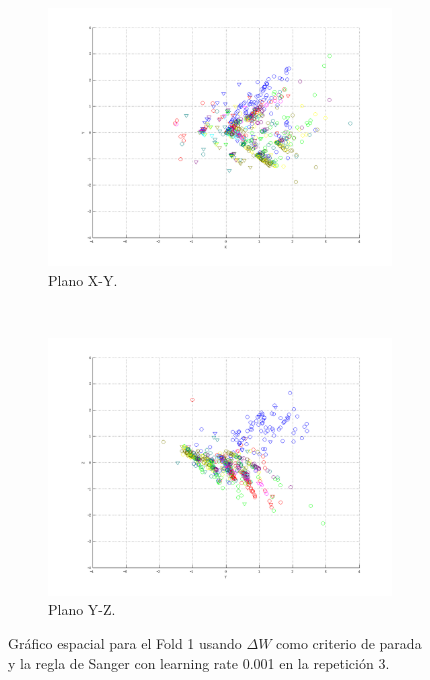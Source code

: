 \documentclass[informe.tex]{subfiles}
\begin{document}
\begin{figure}[H]
        \hspace*{-6.5cm}
        \begin{subfigure}[b]{0.49\textwidth}
                \includegraphics[width=\textwidth]{graficos/fold1_criterioParadap_reglas_alpha0_rep3_2XY.png}
                \caption{Plano X-Y.}
        \end{subfigure}
        ~
        \begin{subfigure}[b]{0.49\textwidth}
                \includegraphics[width=\textwidth]{graficos/fold1_criterioParadap_reglas_alpha0_rep3_3YZ.png}
                \caption{Plano Y-Z.}
        \end{subfigure}
	\restoregeometry
        \caption{Gráfico espacial para el Fold 1 usando $\Delta W$ como criterio de parada y la regla de Sanger con learning rate 0.001 en la repetición 3.}
        \label{fig:fold1_criterioParadap_reglas_alpha0_rep3}
	\end{figure}
      
\end{document}
